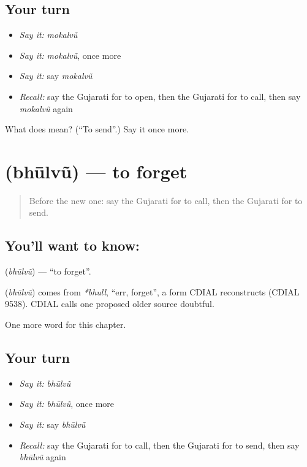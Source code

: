 \subsection*{Your turn}
\begin{itemize}
\raggedright
  \item \emph{Say it:} \emph{mokalvũ}
  \item \emph{Say it:} \emph{mokalvũ}, once more
  \item \emph{Say it:} say \emph{mokalvũ}
  \item \emph{Recall:} say the Gujarati for to open, then the Gujarati for to call, then say \emph{mokalvũ} again
\end{itemize}

\begin{tcolorbox}[breakable,colback=teal!4,colframe=teal!35!black,title={Before you move on}]
What does  mean? (\textquotedblleft{}To send\textquotedblright{}.) Say it once more.
\end{tcolorbox}
\section[\texorpdfstring{\gu{ભૂલવું} (bhūlvũ)}{ભૂલવું (bhūlvũ)}]{ (bhūlvũ) — to forget}

\label{lesson:GU-C139-bhulvu}



\begin{quote}
Before the new one: say the Gujarati for to call, then the Gujarati for to send.
\end{quote}

\subsection*{You'll want to know: }
\textbf{} (\emph{bhūlvũ}) — \textquotedblleft{}to forget\textquotedblright{}.

\begin{cousinweb}
\textbf{} (\emph{bhūlvũ}) comes from \emph{*bhull}, \textquotedblleft{}err, forget\textquotedblright{}, a form CDIAL reconstructs (CDIAL 9538). CDIAL calls one proposed older source doubtful.
\end{cousinweb}

\begin{grammarlens}[title={What you've built}]
One more word for this chapter.
\end{grammarlens}

\subsection*{Your turn}
\begin{itemize}
\raggedright
  \item \emph{Say it:} \emph{bhūlvũ}
  \item \emph{Say it:} \emph{bhūlvũ}, once more
  \item \emph{Say it:} say \emph{bhūlvũ}
  \item \emph{Recall:} say the Gujarati for to call, then the Gujarati for to send, then say \emph{bhūlvũ} again
\end{itemize}

